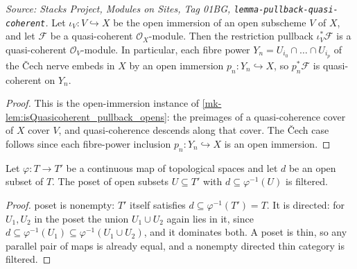 \begin{lemma}\label{mk-lem:pullback_preserves_quasicoherent}
  \leanok

  \textit{Source: Stacks Project, Modules on Sites, Tag 01BG, \texttt{lemma-pullback-quasi-coherent}.}
  Let \(\iota_V : V \hookrightarrow X\) be the open immersion of an open subscheme \(V\) of \(X\),
  and let \(\mathcal{F}\) be a quasi-coherent \(\mathcal{O}_X\)-module. Then the restriction
  pullback \(\iota_V^*\mathcal{F}\) is a quasi-coherent \(\mathcal{O}_V\)-module. In particular,
  each fibre power \(Y_n = U_{i_0} \cap \dots \cap U_{i_p}\) of the {\v C}ech nerve embeds in
  \(X\) by an open immersion \(p_n : Y_n \hookrightarrow X\), so \(p_n^*\mathcal{F}\) is
  quasi-coherent on \(Y_n\).
\end{lemma}
\begin{proof}
  This is the open-immersion instance of \ref{mk-lem:isQuasicoherent_pullback_opens}: the
  preimages of a quasi-coherence cover of \(X\) cover \(V\), and quasi-coherence descends
  along that cover. The {\v C}ech case follows since each fibre-power inclusion
  \(p_n : Y_n \hookrightarrow X\) is an open immersion.
\end{proof}

\begin{lemma}\label{mk-lem:opensMap_structuredArrow_isFiltered}
  \leanok

  Let \(\varphi : T \to T'\) be a continuous map of topological spaces and let \(d\) be an
  open subset of \(T\). The poset of open subsets \(U \subseteq T'\) with
  \(d \subseteq \varphi^{-1}(U)\) is filtered.
\end{lemma}
\begin{proof}
  \leanokThe poset is nonempty: \(T'\) itself satisfies \(d \subseteq \varphi^{-1}(T') = T\). It is
  directed: for \(U_1, U_2\) in the poset the union \(U_1 \cup U_2\) again lies in it, since
  \(d \subseteq \varphi^{-1}(U_1) \subseteq \varphi^{-1}(U_1 \cup U_2)\), and it dominates
  both. A poset is thin, so any parallel pair of maps is already equal, and a nonempty
  directed thin category is filtered.
\end{proof}

